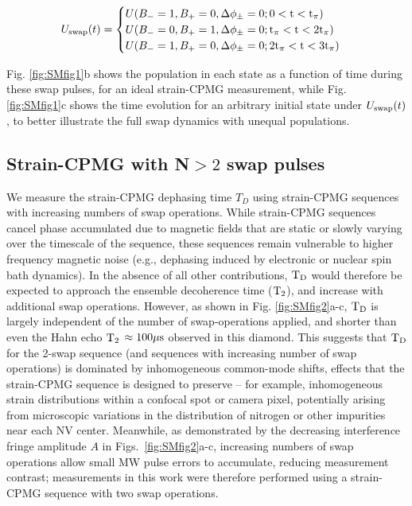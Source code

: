 \documentclass[reprint,superscriptaddress,hyphens,amsmath,amssymb,aps,prx,float]{revtex4-2}
\begin{document}
\begin{align}
\label{eqn:swap_evolution}
    U_{\rm swap}(t)=
        \begin{cases}
        U(B_-=1,B_+=0,\Delta \phi_\pm=0;0<\rm{t<t_\pi})\\
        U(B_-=0,B_+=1,\Delta \phi_\pm=0;\rm{t_\pi}<t<\rm{2t_\pi})\\
        U(B_-=1,B_+=0,\Delta \phi_\pm=0;\rm{2t_\pi}<t<\rm{3t_\pi})
        \end{cases}
\end{align}

Fig. \ref{fig:SMfig1}b shows the population in each state as a function of time during these swap pulses, for an ideal strain-CPMG measurement, while Fig. \ref{fig:SMfig1}c shows the time evolution for an arbitrary initial state under $U_{\rm swap}(t)$, to better illustrate the full swap dynamics with unequal populations.

\subsection{Strain-CPMG with N$>2$ swap pulses}

We measure the strain-CPMG dephasing time $T_D$ using strain-CPMG sequences with increasing numbers of swap operations.  While strain-CPMG sequences cancel phase accumulated due to magnetic fields that are static or slowly varying over the timescale of the sequence, these sequences remain vulnerable to higher frequency magnetic noise (e.g., dephasing induced by electronic or nuclear spin bath dynamics). In the absence of all other contributions, $\rm{T_D}$ would therefore be expected to approach the ensemble decoherence time ($\rm{T_2}$), and increase with additional swap operations.  However, as shown in Fig. \ref{fig:SMfig2}a-c, $\rm{T_D}$ is largely independent of the number of swap-operations applied, and shorter than even the Hahn echo $\rm{T_2}$ $\approx100\rm{\mu s}$ observed in this diamond.  This suggests that $\rm{T_D}$ for the 2-swap sequence (and sequences with increasing number of swap operations) is dominated by inhomogeneous common-mode shifts, effects that the strain-CPMG sequence is designed to preserve -- for example, inhomogeneous strain distributions within a confocal spot or camera pixel, potentially arising from microscopic variations in the distribution of nitrogen or other impurities near each NV center.  Meanwhile, as demonstrated by the decreasing interference fringe amplitude $A$ in Figs.~\ref{fig:SMfig2}a-c, increasing numbers of swap operations allow small MW pulse errors to accumulate, reducing measurement contrast; measurements in this work were therefore performed using a strain-CPMG sequence with two swap operations.
\end{document}
